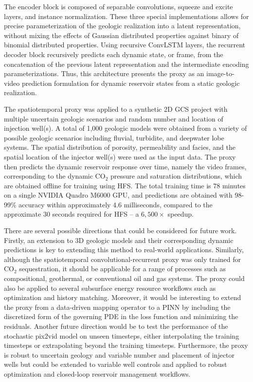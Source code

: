 \documentclass[default,iicol]{sn-jnl}
\begin{document}
The encoder block is composed of separable convolutions, squeeze and excite layers, and instance normalization. These three special implementations allows for precise parameterization of the geologic realization into a latent representation, without mixing the effects of Gaussian distributed properties against binary of binomial distributed properties. Using recursive ConvLSTM layers, the recurrent decoder block recursively predicts each dynamic state, or frame, from the concatenation of the previous latent representation and the intermediate encoding parameterizations. Thus, this architecture presents the proxy as an image-to-video prediction formulation for dynamic reservoir states from a static geologic realization.

The spatiotemporal proxy was applied to a synthetic 2D GCS project with multiple uncertain geologic scenarios and random number and location of injection well(s). A total of 1,000 geologic models were obtained from a variety of possible geologic scenarios including fluvial, turbidite, and deepwater lobe systems. The spatial distribution of porosity, permeability and facies, and the spatial location of the injector well(s) were used as the input data. The proxy then predicts the dynamic reservoir response over time, namely the video frames, corresponding to the dynamic CO$_2$ pressure and saturation distributions, which are obtained offline for training using HFS. The total training time is 78 minutes on a single NVIDIA Quadro M6000 GPU, and predictions are obtained with 98-99\% accuracy within approximately 4.6 milliseconds, compared to the approximate 30 seconds required for HFS – a $6,500\times$ speedup. 

There are several possible directions that could be considered for future work. Firstly, an extension to 3D geologic models and their corresponding dynamic predictions is key to extending this method to real-world applications. Similarly, although the spatiotemporal convolutional-recurrent proxy was only trained for CO$_2$ sequestration, it should be applicable for a range of processes such as compositional, geothermal, or conventional oil and gas systems. The proxy could also be applied to several subsurface energy resource workflows such as optimization and history matching. Moreover, it would be interesting to extend the proxy from a data-driven mapping operator to a PINN by including the discretized form of the governing PDE in the loss function and minimizing the residuals. Another future direction would be to test the performance of the stochastic pix2vid model on unseen timesteps, either interpolating the training timesteps or extrapolating beyond the training timesteps. Furthermore, the proxy is robust to uncertain geology and variable number and placement of injector wells but could be extended to variable well controls and applied to robust optimization and closed-loop reservoir management workflows. 
\end{document}
